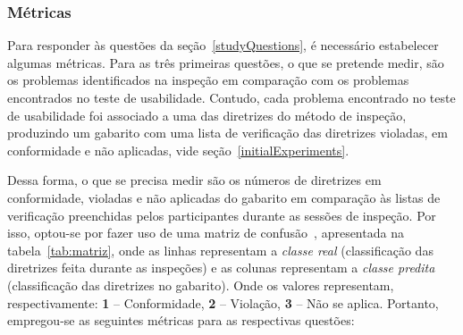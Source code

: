 \subsubsection{Métricas}
\label{studyMetrics}

Para responder às questões da seção~\ref{studyQuestions}, é necessário
estabelecer algumas  métricas. Para as três primeiras  questões, o que
se  pretende medir,  são  os problemas  identificados  na inspeção  em
comparação  com  os problemas  encontrados  no  teste de  usabilidade.
Contudo,  cada  problema  encontrado   no  teste  de  usabilidade  foi
associado a  uma das diretrizes  do método de inspeção,  produzindo um
gabarito  com uma  lista de  verificação das  diretrizes  violadas, em
conformidade  e  não  aplicadas, vide  seção~\ref{initialExperiments}.

Dessa forma,  o que se precisa  medir são os números  de diretrizes em
conformidade, violadas  e não aplicadas  do gabarito em  comparação às
listas  de  verificação  preenchidas  pelos participantes  durante  as
sessões de inspeção. Por isso, optou-se por fazer uso de uma matriz de
confusão~\cite{Tan:etal:2005}, apresentada na tabela~\ref{tab:matriz},
onde  as linhas  representam a  {\em classe  real}  (classificação das
diretrizes feita durante as inspeções) e as colunas representam a {\em
  classe predita} (classificação das diretrizes no gabarito).  Onde os
valores representam, respectivamente: {\bf 1} -- Conformidade, {\bf 2}
-- Violação,  {\bf 3}  --  Não se  aplica.   Portanto, empregou-se  as
seguintes métricas para as respectivas questões:


